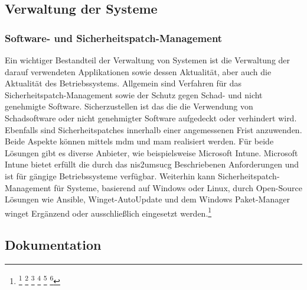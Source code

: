 \documentclass[11pt,a4paper,hidelinks]{article}   %
\begin{document}
        \subsection{Verwaltung der Systeme}
            \subsubsection{Software- und Sicherheitspatch-Management}
            Ein wichtiger Bestandteil der Verwaltung von Systemen ist die Verwaltung der darauf verwendeten Applikationen sowie dessen Aktualität, aber auch die Aktualität des Betriebssystems. Allgemein sind Verfahren für das Sicherheitspatch-Management sowie der Schutz gegen Schad- und nicht genehmigte Software. Sicherzustellen ist das die die Verwendung von Schadsoftware oder nicht genehmigter Software aufgedeckt oder verhindert wird. Ebenfalls sind Sicherheitspatches innerhalb einer angemessenen Frist anzuwenden. Beide Aspekte können mittels \gls{mdm} und \gls{mam} realisiert werden. Für beide Lösungen gibt es diverse Anbieter, wie beispielsweise Microsoft Intune. Microsoft Intune bietet erfüllt die durch das \gls{nis2umsucg} Beschriebenen Anforderungen und ist für gängige Betriebssysteme verfügbar. Weiterhin kann Sicherheitspatch-Management für Systeme, basierend auf Windows oder Linux, durch Open-Source Lösungen wie Ansible, Winget-AutoUpdate und dem Windows Paket-Manager winget Ergänzend oder ausschließlich eingesetzt werden.\footnote{
                \footcite[Vgl.][, S. 21 \& 118]{9781509301331}
                \footcite[Vgl.][, S. 1]{microsoft:731618}
                \footcite[Vgl.][, S. 1]{github:731618}
                \footcite[Vgl.][, S. 397 - 380]{10.1365-s40702-015-0117-5}
                \footcite[Vgl.][, S. 29 - 30]{9781837631636}
                \footcite[Vgl.][, S. 1]{microsoft:5f43b2}
            }
            
        \subsection{Dokumentation}
\end{document}
